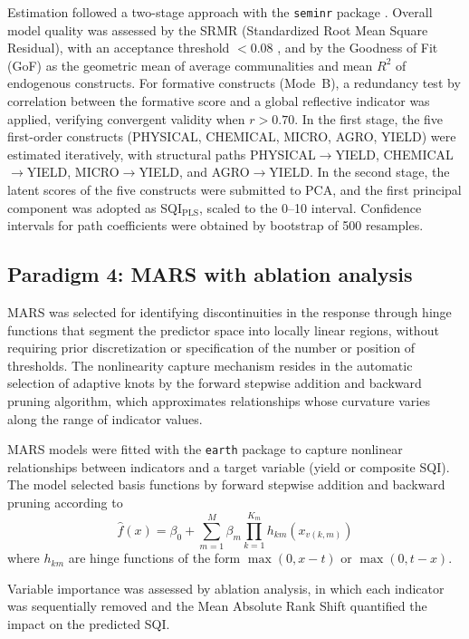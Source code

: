 \documentclass[pdflatex,sn-basic]{sn-jnl}%
\begin{document}
Estimation followed a two-stage approach with the \texttt{seminr} package \citep{Ray2022}. Overall model quality was assessed by the SRMR (Standardized Root Mean Square Residual), with an acceptance threshold $< 0.08$ \citep{Hair2019}, and by the Goodness of Fit (GoF) as the geometric mean of average communalities and mean $R^2$ of endogenous constructs. For formative constructs (Mode~B), a redundancy test by correlation between the formative score and a global reflective indicator was applied, verifying convergent validity when $r > 0.70$. In the first stage, the five first-order constructs (PHYSICAL, CHEMICAL, MICRO, AGRO, YIELD) were estimated iteratively, with structural paths PHYSICAL$\to$YIELD, CHEMICAL$\to$YIELD, MICRO$\to$YIELD, and AGRO$\to$YIELD. In the second stage, the latent scores of the five constructs were submitted to PCA, and the first principal component was adopted as SQI$_{\text{PLS}}$, scaled to the 0--10 interval. Confidence intervals for path coefficients were obtained by bootstrap of 500 resamples.

\subsection{Paradigm 4: MARS with ablation analysis}\label{subsec:mars}

MARS was selected for identifying discontinuities in the response through hinge functions that segment the predictor space into locally linear regions, without requiring prior discretization or specification of the number or position of thresholds. The nonlinearity capture mechanism resides in the automatic selection of adaptive knots by the forward stepwise addition and backward pruning algorithm, which approximates relationships whose curvature varies along the range of indicator values.

MARS models \citep{Friedman1991} were fitted with the \texttt{earth} package \citep{Milborrow2023} to capture nonlinear relationships between indicators and a target variable (yield or composite SQI). The model selected basis functions by forward stepwise addition and backward pruning according to
\begin{equation}
\hat{f}(x) = \beta_0 + \sum_{m=1}^{M} \beta_m \prod_{k=1}^{K_m} h_{km}(x_{v(k,m)})
\label{eq:mars}
\end{equation}
where $h_{km}$ are hinge functions of the form $\max(0, x - t)$ or $\max(0, t - x)$.

Variable importance was assessed by ablation analysis, in which each indicator was sequentially removed and the Mean Absolute Rank Shift quantified the impact on the predicted SQI.
\end{document}
